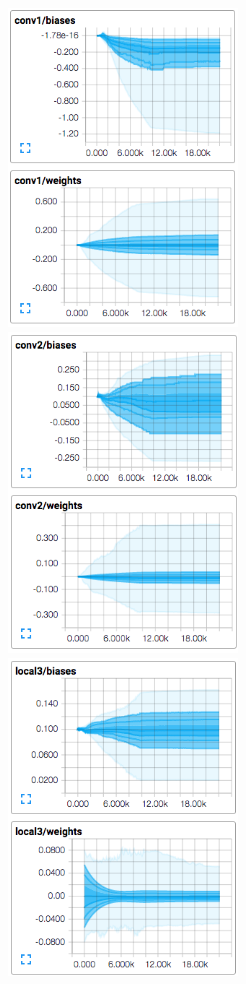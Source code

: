\documentclass[10pt, twocolumn, twoside]{article}
\begin{document}
\begin{figure}
	\centering
	\includegraphics[width=2.4in]{conv1_params}
	\includegraphics[width=2.4in]{conv2_params}
	\includegraphics[width=2.4in]{local3_params}

\end{figure}
\end{document}
